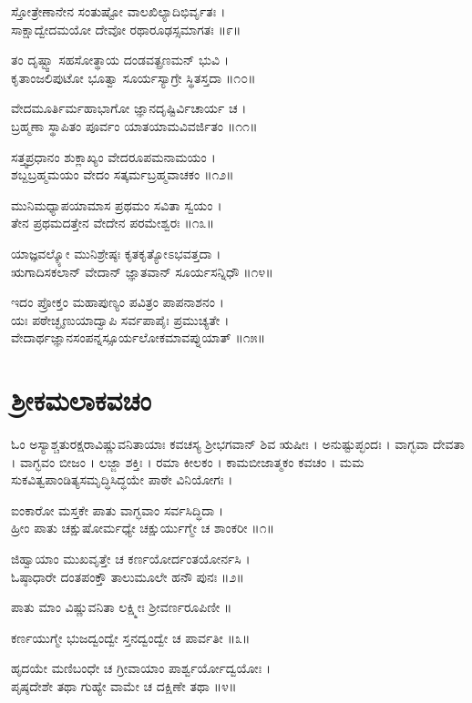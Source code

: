 ಸ್ತೋತ್ರೇಣಾನೇನ ಸಂತುಷ್ಟೋ ವಾಲಖಿಲ್ಯಾದಿಭಿರ್ವೃತಃ ।\\
ಸಾಕ್ಷಾದ್ವೇದಮಯೋ ದೇವೋ ರಥಾರೂಢಸ್ಸಮಾಗತಃ ॥೯॥

ತಂ ದೃಷ್ಟ್ವಾ ಸಹಸೋತ್ಥಾಯ ದಂಡವತ್ಪ್ರಣಮನ್ ಭುವಿ ।\\
ಕೃತಾಂಜಲಿಪುಟೋ ಭೂತ್ವಾ ಸೂರ್ಯಸ್ಯಾಗ್ರೇ ಸ್ಥಿತಸ್ತದಾ ॥೧೦॥

ವೇದಮೂರ್ತಿರ್ಮಹಾಭಾಗೋ ಜ್ಞಾನದೃಷ್ಟಿರ್ವಿಚಾರ್ಯ ಚ ।\\
ಬ್ರಹ್ಮಣಾ ಸ್ಥಾಪಿತಂ ಪೂರ್ವಂ ಯಾತಯಾಮವಿವರ್ಜಿತಂ ॥೧೧॥

ಸತ್ತ್ವಪ್ರಧಾನಂ ಶುಕ್ಲಾಖ್ಯಂ ವೇದರೂಪಮನಾಮಯಂ ।\\
ಶಬ್ದಬ್ರಹ್ಮಮಯಂ ವೇದಂ ಸತ್ಕರ್ಮಬ್ರಹ್ಮವಾಚಕಂ ॥೧೨॥

ಮುನಿಮಧ್ಯಾಪಯಾಮಾಸ ಪ್ರಥಮಂ ಸವಿತಾ ಸ್ವಯಂ ।\\
ತೇನ ಪ್ರಥಮದತ್ತೇನ ವೇದೇನ ಪರಮೇಶ್ವರಃ ॥೧೩॥

ಯಾಜ್ಞವಲ್ಕ್ಯೋ ಮುನಿಶ್ರೇಷ್ಠಃ ಕೃತಕೃತ್ಯೋಽಭವತ್ತದಾ ।\\
ಋಗಾದಿಸಕಲಾನ್ ವೇದಾನ್ ಜ್ಞಾತವಾನ್ ಸೂರ್ಯಸನ್ನಿಧೌ ॥೧೪॥

ಇದಂ ಪ್ರೋಕ್ತಂ ಮಹಾಪುಣ್ಯಂ ಪವಿತ್ರಂ ಪಾಪನಾಶನಂ ।\\
ಯಃ ಪಠೇಚ್ಛೃಣುಯಾದ್ವಾಪಿ ಸರ್ವಪಾಪೈಃ ಪ್ರಮುಚ್ಯತೇ ।\\
ವೇದಾರ್ಥಜ್ಞಾನಸಂಪನ್ನಸ್ಸೂರ್ಯಲೋಕಮಾವಪ್ನುಯಾತ್ ॥೧೫॥


\section{ಶ್ರೀಕಮಲಾಕವಚಂ}

ಓಂ ಅಸ್ಯಾಶ್ಚತುರಕ್ಷರಾವಿಷ್ಣುವನಿತಾಯಾಃ ಕವಚಸ್ಯ ಶ್ರೀಭಗವಾನ್ ಶಿವ ಋಷೀಃ । ಅನುಷ್ಟುಪ್ಛಂದಃ । ವಾಗ್ಭವಾ ದೇವತಾ । ವಾಗ್ಭವಂ ಬೀಜಂ । ಲಜ್ಜಾ ಶಕ್ತಿಃ । ರಮಾ ಕೀಲಕಂ । ಕಾಮಬೀಜಾತ್ಮಕಂ ಕವಚಂ । ಮಮ ಸುಕವಿತ್ವಪಾಂಡಿತ್ಯಸಮೃದ್ಧಿಸಿದ್ಧಯೇ ಪಾಠೇ ವಿನಿಯೋಗಃ ।

ಐಂಕಾರೋ ಮಸ್ತಕೇ ಪಾತು ವಾಗ್ಭವಾಂ ಸರ್ವಸಿದ್ಧಿದಾ ।\\
ಹ್ರೀಂ ಪಾತು ಚಕ್ಷುಷೋರ್ಮಧ್ಯೇ ಚಕ್ಷುರ್ಯುಗ್ಮೇ ಚ ಶಾಂಕರೀ ॥೧॥

ಜಿಹ್ವಾಯಾಂ ಮುಖವೃತ್ತೇ ಚ ಕರ್ಣಯೋರ್ದಂತಯೋರ್ನಸಿ ।\\
ಓಷ್ಠಾಧಾರೇ ದಂತಪಂಕ್ತೌ ತಾಲುಮೂಲೇ ಹನೌ ಪುನಃ ॥೨॥

ಪಾತು ಮಾಂ ವಿಷ್ಣುವನಿತಾ ಲಕ್ಷ್ಮೀಃ ಶ್ರೀವರ್ಣರೂಪಿಣೀ ॥

ಕರ್ಣಯುಗ್ಮೇ ಭುಜದ್ವಂದ್ವೇ ಸ್ತನದ್ವಂದ್ವೇ ಚ ಪಾರ್ವತೀ ॥೩॥

ಹೃದಯೇ ಮಣಿಬಂಧೇ ಚ ಗ್ರೀವಾಯಾಂ ಪಾರ್ಶ್ವರ್ಯೋದ್ವಯೋಃ ।\\
ಪೃಷ್ಠದೇಶೇ ತಥಾ ಗುಹ್ಯೇ ವಾಮೇ ಚ ದಕ್ಷಿಣೇ ತಥಾ ॥೪॥

